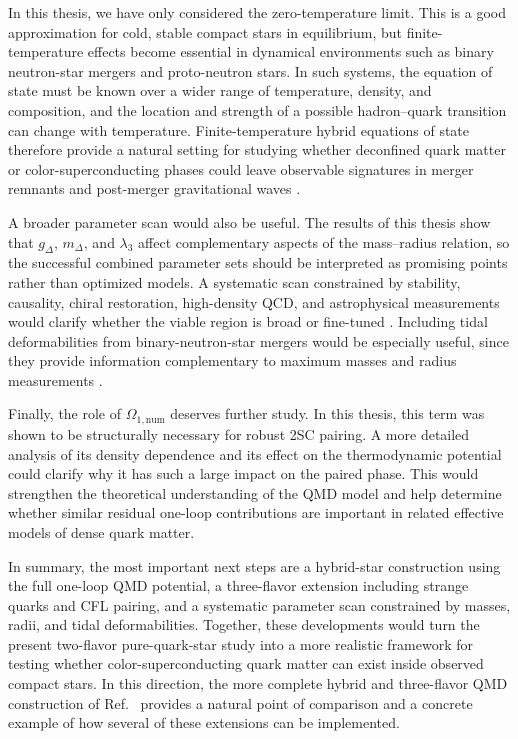 In this thesis, we have only considered the zero-temperature limit.
This is a good approximation for cold, stable compact stars
in equilibrium, but finite-temperature effects become
essential in dynamical environments such as binary neutron-star mergers
and proto-neutron stars. In such systems, the equation of state must be
known over a wider range of temperature, density, and composition, and
the location and strength of a possible hadron--quark transition can
change with temperature. Finite-temperature hybrid equations of state
therefore provide a natural setting for studying whether deconfined quark
matter or color-superconducting phases could leave observable signatures
in merger remnants and post-merger gravitational waves
\cite{Most2019,Bauswein2019,Chesler2019}.

A broader parameter scan would also be useful. The results of this thesis show
that \(g_\Delta\), \(m_\Delta\), and \(\lambda_3\) affect complementary aspects
of the mass--radius relation, so the successful combined parameter sets should
be interpreted as promising points rather than optimized models. A systematic
scan constrained by stability, causality, chiral restoration, high-density QCD,
and astrophysical measurements would clarify whether the viable region is broad
or fine-tuned \cite{Kurkela2010,Kurkela2014,Komoltsev2022,Annala2020}. Including
tidal deformabilities from binary-neutron-star mergers would be especially
useful, since they provide information complementary to maximum masses and
radius measurements \cite{LIGO2018,De2018,Raithel2018,Tews2018}.

Finally, the role of \(\Omega_{1,\mathrm{num}}\) deserves further study. In this
thesis, this term was shown to be structurally necessary for robust 2SC pairing.
A more detailed analysis of its density dependence and its effect on the
thermodynamic potential could clarify why it has such a large
impact on the paired phase. This would strengthen the theoretical understanding
of the QMD model and help determine whether similar residual one-loop
contributions are important in related effective models of dense quark matter.

In summary, the most important next steps are a hybrid-star construction using
the full one-loop QMD potential, a three-flavor extension including strange
quarks and CFL pairing, and a systematic parameter scan constrained by masses,
radii, and tidal deformabilities. Together, these developments would turn the
present two-flavor pure-quark-star study into a more realistic framework for
testing whether color-superconducting quark matter can exist inside observed
compact stars. In this direction, the more complete hybrid and three-flavor QMD
construction of Ref.~\cite{Andersen2026} provides a natural point of comparison
and a concrete example of how several of these extensions can be implemented.
